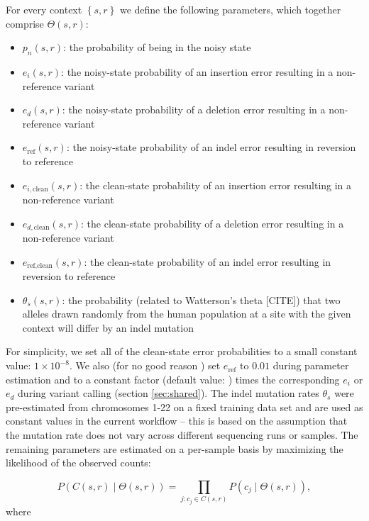 \documentclass{article}
\begin{document}
For every context $\left\{ s,r \right\}$ we define the following parameters, which together comprise $\Theta(s,r)$:
\begin{itemize}
\item $p_n(s,r)$: the probability of being in the noisy state
\item $e_i(s,r)$: the noisy-state probability of an insertion error resulting in a non-reference variant
\item $e_d(s,r)$: the noisy-state probability of a deletion error resulting in a non-reference variant
\item $e_{\text{ref}}(s,r)$: the noisy-state probability of an indel error resulting in reversion to reference
\item $e_{i,\text{clean}}(s,r)$: the clean-state probability of an insertion error resulting in a non-reference variant
\item $e_{d,\text{clean}}(s,r)$: the clean-state probability of a deletion error resulting in a non-reference variant
\item $e_{\text{ref},\text{clean}}(s,r)$: the clean-state probability of an indel error resulting in reversion to reference
\item $\theta_s(s,r)$: the probability (related to Watterson's theta [CITE]) that two alleles drawn randomly from the human population at a site with the given context will differ by an indel mutation 
\end{itemize}
For simplicity, we set all of the clean-state error probabilities to a small constant value: $1 \times 10^{-8}$. We also (for no good reason ) set $e_{\text{ref}}$ to $0.01$ during parameter estimation and to a constant factor (default value: ) times the corresponding $e_i$ or $e_d$ during variant calling (section \ref{sec:shared}). The indel mutation rates $\theta_s$ were pre-estimated from chromosomes 1-22 on a fixed training data set and are used as constant values in the current workflow -- this is based on the assumption that the mutation rate does not vary across different sequencing runs or samples. The remaining parameters are estimated on a per-sample basis  by maximizing the likelihood of the observed counts:

\begin{equation*}
P(C(s,r) \mid \Theta(s,r))=\prod_{j: c_j\in C(s,r)}P(c_j \mid \Theta(s,r)),
\end{equation*}
where
\end{document}
